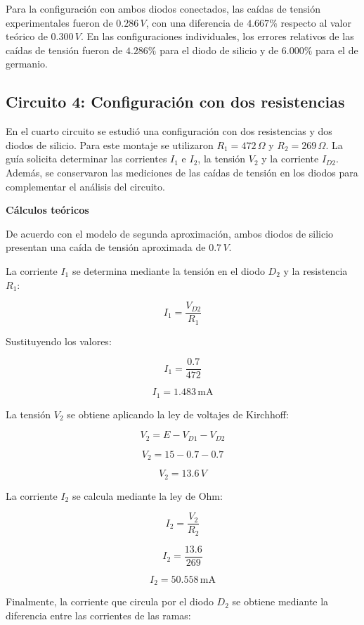 \noindent
Para la configuración con ambos diodos conectados, las caídas de tensión experimentales fueron de \(0.286\,V\), con una diferencia de \(4.667\%\) respecto al valor teórico de \(0.300\,V\). En las configuraciones individuales, los errores relativos de las caídas de tensión fueron de \(4.286\%\) para el diodo de silicio y de \(6.000\%\) para el de germanio.

\subsection{Circuito 4: Configuración con dos resistencias}

En el cuarto circuito se estudió una configuración con dos resistencias y dos diodos de silicio. Para este montaje se utilizaron \(R_1=472\,\Omega\) y \(R_2=269\,\Omega\). La guía solicita determinar las corrientes \(I_1\) e \(I_2\), la tensión \(V_2\) y la corriente \(I_{D2}\). Además, se conservaron las mediciones de las caídas de tensión en los diodos para complementar el análisis del circuito.

\vspace{0.3cm}

\textbf{Cálculos teóricos}

De acuerdo con el modelo de segunda aproximación, ambos diodos de silicio presentan una caída de tensión aproximada de \(0.7\,V\).

La corriente \(I_1\) se determina mediante la tensión en el diodo \(D_2\) y la resistencia \(R_1\):

\[
I_1=\frac{V_{D2}}{R_1}
\]

Sustituyendo los valores:

\[
I_1=\frac{0.7}{472}
\]

\[
\boxed{I_1=1.483\,\text{mA}}
\]

La tensión \(V_2\) se obtiene aplicando la ley de voltajes de Kirchhoff:

\[
V_2=E-V_{D1}-V_{D2}
\]

\[
V_2=15-0.7-0.7
\]

\[
\boxed{V_2=13.6\,V}
\]

La corriente \(I_2\) se calcula mediante la ley de Ohm:

\[
I_2=\frac{V_2}{R_2}
\]

\[
I_2=\frac{13.6}{269}
\]

\[
\boxed{I_2=50.558\,\text{mA}}
\]

Finalmente, la corriente que circula por el diodo \(D_2\) se obtiene mediante la diferencia entre las corrientes de las ramas:


